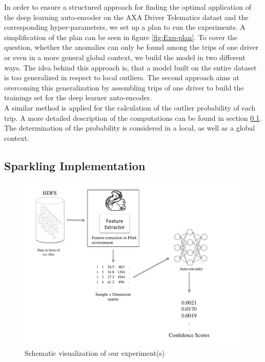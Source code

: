 \documentclass{vldb}
\begin{document}
In order to ensure a structured approach for finding the optimal application of the deep learning auto-encoder on the AXA Driver Telematics datast and the corresponding hyper-parameters, we set up a plan to run the experiments. A simplification of the plan can be seen in figure \ref{fig:Exp-plan}. To cover the question, whether the anomalies can only be found among the trips of one driver or even in a more general global context, we build the model in two different ways. The idea behind this approach is, that a model built on the entire dataset is too generalized in respect to local outliers. The second approach aims at overcoming this generalization by assembling trips of one driver to build the trainings set for the deep learner auto-encoder.\\
A similar method is applied for the calculation of the outlier probability of each trip. A more detailed description of the computations can be found in section \ref{subsec:sparkling-impl}. The determination of the probability is considered in a local, as well as a global context.


\subsection{Sparkling Implementation}
\label{subsec:sparkling-impl}

\begin{figure}
\centering
\includegraphics[trim=1cm 0cm 1cm 0.5cm, clip=true, width=\linewidth]{"pics/approach2"}
\caption{Schematic visualization of our experiment(s)}
\label{fig:approach-2}
\end{figure}
\end{document}
